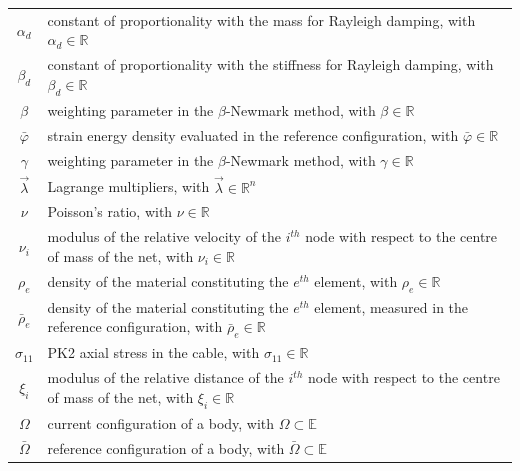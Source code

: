 \begin{tabular}{cp{}}
  $ \alpha_d $ & constant of proportionality with the mass for Rayleigh damping, with $\alpha_d \in \mathbb{R}$ \\
  $ \beta_d  $ & constant of proportionality with the stiffness for Rayleigh damping, with $\beta_d \in \mathbb{R}$ \\
  $ \beta $ & weighting parameter in the $\beta$-Newmark method, with $\beta \in \mathbb{R}$ \\
  $\bar{\varphi}$ & strain energy density evaluated in the reference configuration, with $\bar{\varphi} \in \mathbb{R}$ \\
  $ \gamma $ & weighting parameter in the $\beta$-Newmark method, with $\gamma \in \mathbb{R}$ \\
  $\vec{\lambda}$ & Lagrange multipliers, with $\vec{\lambda} \in \mathbb{R}^n $ \\
  $ \nu $ & Poisson's ratio, with $\nu \in \mathbb{R}$ \\
  $ \nu_i $ & modulus of the relative velocity of the $i^{th}$ node with respect to the centre of mass of the net, with $\nu_i \in \mathbb{R}$ \\
  $ \rho_e $ & density of the material constituting the $e^{th}$ element, with $\rho_e \in \mathbb{R}$ \\
  $ \bar{\rho}_e $ & density of the material constituting the $e^{th}$ element, measured in the reference configuration, with $\bar{\rho}_e \in \mathbb{R}$ \\
  $ \sigma_{11} $ & PK2 axial stress in the cable, with $\sigma_{11} \in \mathbb{R}$ \\
  $ \xi_i $ & modulus of the relative distance of the $i^{th}$ node with respect to the centre of mass of the net, with $\xi_i \in \mathbb{R}$ \\ 
  $\Omega$ & current configuration of a body, with $\Omega \subset \mathbb{E}$ \\
  $\bar{\Omega}$ & reference configuration of a body, with $\bar{\Omega} \subset \mathbb{E}$ \\
\end{tabular}\\

